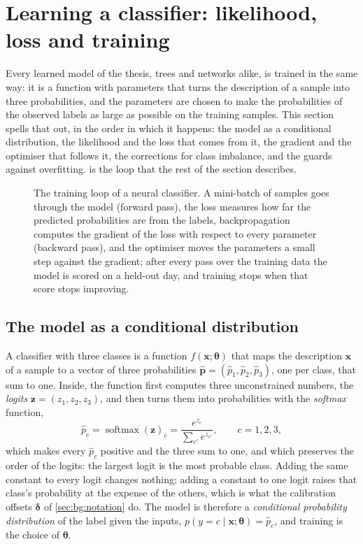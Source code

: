 \section[Learning a classifier]{Learning a classifier: likelihood, loss and training}
\label{sec:bg:learning}

Every learned model of the thesis, trees and networks alike, is trained in the same way:
it is a function with parameters that turns the description of a sample into three
probabilities, and the parameters are chosen to make the probabilities of the observed
labels as large as possible on the training samples.  This section spells that out, in
the order in which it happens: the model as a conditional distribution, the likelihood and
the loss that comes from it, the gradient and the optimiser that follows it, the
corrections for class imbalance, and the guards against overfitting.   is the loop that the
rest of the section describes.

\begin{figure}[t]
\centering
\resizebox{\textwidth}{!}{}
\caption{The training loop of a neural classifier.  A mini-batch of samples goes through
the model (forward pass), the loss measures how far the predicted probabilities are from
the labels, backpropagation computes the gradient of the loss with respect to every
parameter (backward pass), and the optimiser moves the parameters a small step against the
gradient; after every pass over the training data the model is scored on a held-out day,
and training stops when that score stops improving.}
\label{fig:bg:loop}
\end{figure}

\subsection{The model as a conditional distribution}
\label{sec:bg:learning:model}

A classifier with three classes is a function $f(\mathbf{x}; \boldsymbol{\theta})$ that
maps the description $\mathbf{x}$ of a sample to a vector of three probabilities
$\hat{\mathbf{p}} = (\hat{p}_1, \hat{p}_2, \hat{p}_3)$, one per class, that sum to one.
Inside, the function first computes three unconstrained numbers, the \emph{logits}
$\mathbf{z} = (z_1, z_2, z_3)$, and then turns them into probabilities with the
\emph{softmax} function,
\begin{equation}
  \hat{p}_c = \operatorname{softmax}(\mathbf{z})_c = \frac{e^{z_c}}{\sum_{c'} e^{z_{c'}}},
  \qquad c = 1, 2, 3,
  \label{eq:softmax}
\end{equation}
which makes every $\hat{p}_c$ positive and the three sum to one, and which preserves the
order of the logits: the largest logit is the most probable class.  Adding the same
constant to every logit changes nothing; adding a constant to one logit raises that
class's probability at the expense of the others, which is what the calibration offsets
$\boldsymbol{\delta}$ of \cref{sec:bg:notation} do.  The model is therefore a
\emph{conditional probability distribution} of the label given the inputs,
$p(y = c \mid \mathbf{x}; \boldsymbol{\theta}) = \hat{p}_c$, and training is the choice of
$\boldsymbol{\theta}$.

